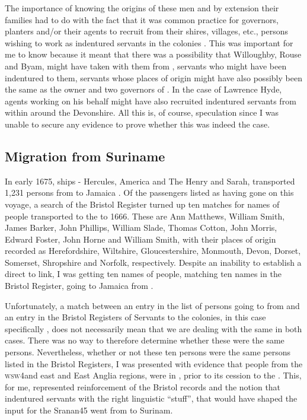 The importance of knowing the origins of these men and by extension their families had to do with the fact that it was common practice for governors, planters and/or their agents to recruit from their shires, villages, etc., persons wishing to work as indentured servants in the colonies \citep{Bridenbaugh68, Beckles89,  Menard06}. This was important for me to know because it meant that there was a possibility that Willoughby, Rouse and Byam, might have taken with them from , servants who might have been indentured to them, servants whose places of origin might have also possibly been the same as the owner and two governors of . In the case of Lawrence Hyde, agents working on his behalf might have also recruited indentured servants from within around the Devonshire. All this is, of course, speculation since I was unable to secure any evidence to prove whether this was indeed the case.

\subsection{Migration from Suriname}\label{6.2.3}
In early 1675,  ships - Hercules, America and The Henry and Sarah, transported 1,231 persons from  to Jamaica \citep[No. 675 vii; 677i]{Sainsbury93}. Of the passengers listed as having gone on this voyage, a search of the Bristol Register turned up ten matches for names of people transported to the  to 1666. These are Ann Matthews, William Smith, James Barker, John Phillips, William Slade, Thomas Cotton, John Morris, Edward Foster, John Horne and William Smith, with their places of origin recorded as Herefordshire, Wiltshire, Gloucestershire, Monmouth, Devon, Dorset, Somerset, Shropshire and Norfolk, respectively. Despite an inability to establish a direct  to  link, I was getting ten names of people, matching ten names in the Bristol Register, going to Jamaica from .

Unfortunately, a match between an entry in the list of persons going to  from  and an entry in the Bristol Registers of Servants to the  colonies, in this case specifically , does not necessarily mean that we are dealing with the same  in both cases. There was no way to therefore determine whether these were the same persons. Nevertheless, whether or not these ten persons were the same persons listed in the Bristol Registers, I was presented with evidence that people from the \textsc{wsw4}and east and East Anglia regions, were in , prior to its cession to the . This, for me, represented reinforcement of the Bristol records and the notion that indentured servants with the right linguistic ``stuff'', that would have shaped the input for the Sranan45 went from  to Surinam.

